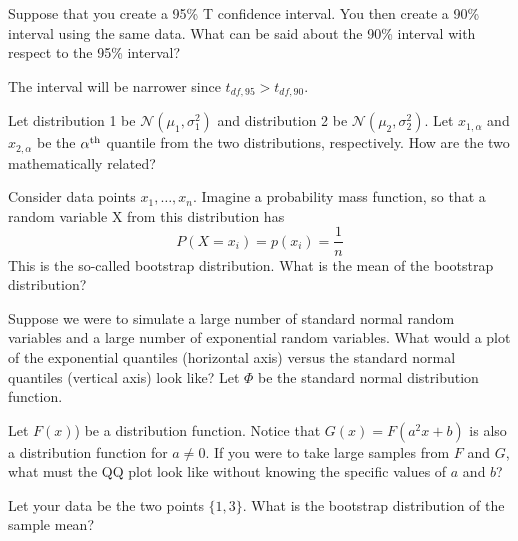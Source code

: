 \documentclass{homework}
\begin{document}
\begin{tcolorbox}[title=Question 6]
Suppose that you create a 95\% T confidence interval. You then create a 90\% interval using the same data. What can be said about the 90\% interval with respect to the 95\% interval?
\end{tcolorbox}

The interval will be narrower since $t_{df, 95} > t_{df, 90}$. \\

\begin{tcolorbox}[title=Question 7]
Let distribution 1 be $\mathcal{N}(\mu_1, \sigma_1^2)$ and distribution 2 be $\mathcal{N}(\mu_2,\sigma_2^2)$. Let $x_{1,\alpha}$ and $x_{2,\alpha}$ be the $\alpha^{\textnormal{th}}$ quantile from the two distributions, respectively. How are the two mathematically related?
\end{tcolorbox}

\begin{tcolorbox}[title=Question 8]
Consider data points $x_1,\ldots, x_n$. Imagine a probability mass function, so that a random variable X from this distribution has
$$ 
P(X = x_i) = p(x_i) = \frac{1}{n}
$$
This is the so-called bootstrap distribution. What is the mean of the bootstrap distribution?
\end{tcolorbox}

\begin{tcolorbox}[title=Question 9]
Suppose we were to simulate a large number of standard normal random variables and a large number of exponential random variables. What would a plot of the exponential quantiles (horizontal axis) versus the standard normal quantiles (vertical axis) look like? Let $\Phi$ be the standard normal distribution function.
\end{tcolorbox}

\begin{tcolorbox}[title=Question 10]
Let $F(x)$) be a distribution function. Notice that $G(x) = F(a^2x + b)$ is also a distribution function for $a \neq 0$. If you were to take large samples from $F$ and $G$, what must the QQ plot look like without knowing the specific values of $a$ and $b$?
\end{tcolorbox}

\begin{tcolorbox}[title=Question 11]
Let your data be the two points $\{1, 3\}$.  What is the bootstrap distribution of the sample mean?
\end{tcolorbox}
\end{document}
